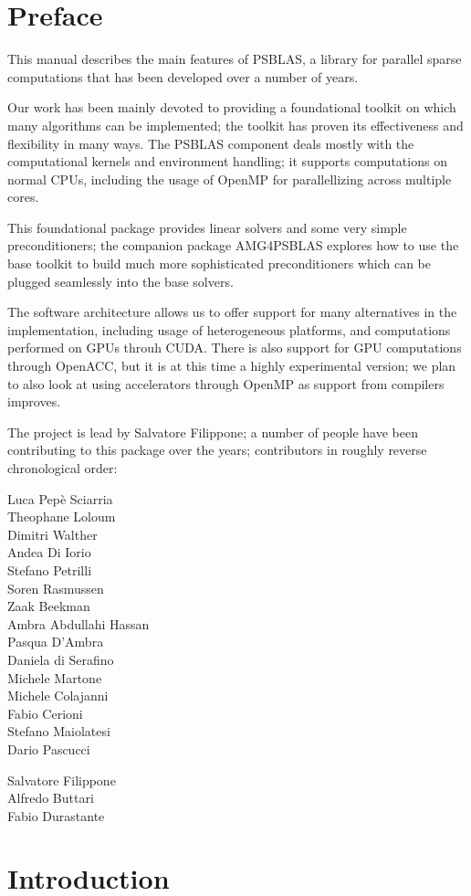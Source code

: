 \section*{Preface}
This manual describes the main features of PSBLAS, a library for
parallel sparse computations that  has been developed over a number of
years.

Our work has been mainly devoted to providing a foundational toolkit
on which many algorithms can be implemented; the toolkit has proven
its effectiveness and flexibility in many ways.
The PSBLAS component deals mostly with the computational kernels and
environment handling; it supports computations on normal CPUs,
including the usage of OpenMP for parallellizing across multiple
cores.

This foundational package provides linear solvers and some very
simple preconditioners; the companion package AMG4PSBLAS explores how
to use the base toolkit to build much more sophisticated
preconditioners which can be plugged seamlessly into the base solvers.  

The software architecture allows us to offer support for many
alternatives in the implementation, including usage of
heterogeneous platforms, and computations performed on GPUs throuh
CUDA. 
There is also support for GPU computations through OpenACC, but it is
at this time a highly experimental version; we plan to also look at
using  accelerators through OpenMP as support from compilers improves. 

The project is lead by Salvatore Filippone; a number of people have
been contributing to this package over the years; contributors in
roughly reverse chronological order: 
\begin{obeylines}
 Luca       Pepè Sciarria
 Theophane  Loloum
 Dimitri    Walther
 Andea      Di Iorio
 Stefano    Petrilli
 Soren 	   Rasmussen
 Zaak       Beekman
 Ambra	   Abdullahi Hassan
 Pasqua	   D'Ambra
 Daniela    di Serafino
 Michele    Martone
 Michele    Colajanni
 Fabio      Cerioni
 Stefano    Maiolatesi
 Dario      Pascucci
\end{obeylines}

\begin{flushright}
  Salvatore Filippone\\
  Alfredo Buttari\\
  Fabio Durastante
\end{flushright}
\clearpage



\section{Introduction}\label{sec:intro}

